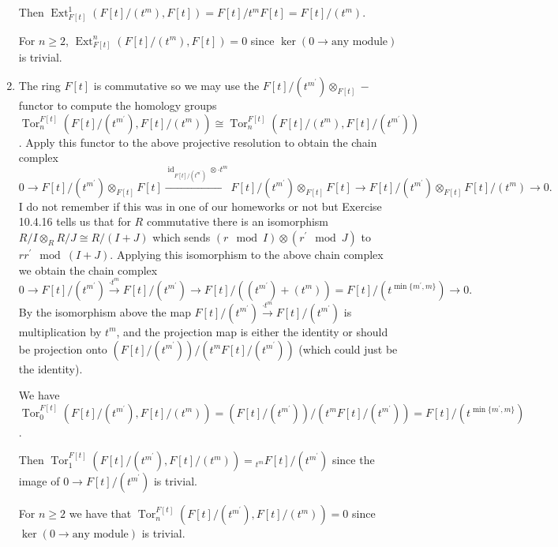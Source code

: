 \documentclass[11pt]{article}
\DeclareMathOperator{\Tor}{Tor}
\DeclareMathOperator{\id}{id}
\DeclareMathOperator{\Ext}{Ext}
\begin{document}
\begin{enumerate}[label=(\alph*)]
    Then $\Ext_{F[t]}^1(F[t]/(t^m), F[t]) = F[t]/t^mF[t] = F[t]/(t^m)$.

    For $n\geq 2$, $\Ext_{F[t]}^n(F[t]/(t^m), F[t]) = 0$ since $\ker (0\to \text{any module})$ is trivial.
    \item The ring $F[t]$ is commutative so we may use the $F[t]/(t^{m^\prime})\otimes_{F[t]} -$ functor to compute the homology groups $\Tor_n^{F[t]}(F[t]/(t^{m^\prime}),F[t]/(t^m))\cong \Tor_n^{F[t]}(F[t]/(t^m),F[t]/(t^{m^\prime}))$. Apply this functor to the above projective resolution to obtain the chain complex \[0\to F[t]/(t^{m^\prime})\otimes_{F[t]}F[t]\xrightarrow{\id_{F[t]/(t^{m^\prime})}\otimes \cdot t^m}F[t]/(t^{m^\prime})\otimes_{F[t]}F[t]\to F[t]/(t^{m^\prime})\otimes_{F[t]}F[t]/(t^m)\to 0.\] 
    I do not remember if this was in one of our homeworks or not but Exercise 10.4.16 tells us that for $R$ commutative there is an isomorphism $R/I\otimes_R R/J\cong R/(I+J)$ which sends $(r\mod I)\otimes (r^\prime \mod J)$ to $rr^\prime \mod (I+J)$. Applying this isomorphism to the above chain complex we obtain the chain complex \[0\to F[t]/(t^{m^\prime})\xrightarrow{\cdot t^m} F[t]/(t^{m^\prime})\to F[t]/((t^{m^\prime})+(t^m)) = F[t]/(t^{\min\{m^\prime,m\}})\to 0.\] By the isomorphism above the map $F[t]/(t^{m^\prime})\xrightarrow{\cdot t^m} F[t]/(t^{m^\prime})$ is multiplication by $t^m$, and the projection map is either the identity or should be projection onto $(F[t]/(t^{m^\prime}))/(t^mF[t]/(t^{m^\prime}))$ (which could just be the identity). 

    We have $\Tor_0^{F[t]}(F[t]/(t^{m^\prime}),F[t]/(t^m)) = (F[t]/(t^{m^\prime}))/(t^mF[t]/(t^{m^\prime})) = F[t]/(t^{\min\{m^\prime,m\}})$.

    Then $\Tor_1^{F[t]}(F[t]/(t^{m^\prime}),F[t]/(t^m)) = {}_{t^m}F[t]/(t^{m^\prime})$ since the image of $0\to F[t]/(t^{m^\prime})$ is trivial.

    For $n\geq 2$ we have that $\Tor_n^{F[t]}(F[t]/(t^{m^\prime}),F[t]/(t^m)) = 0$ since $\ker (0\to \text{any module})$ is trivial.
   \end{enumerate}
   
\end{document}
